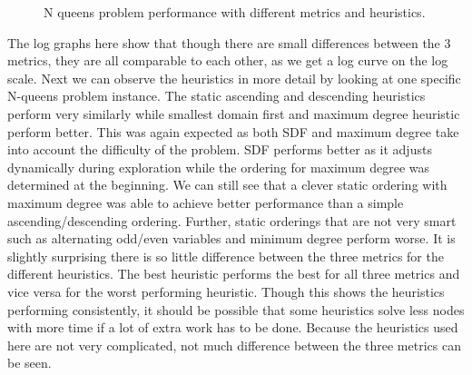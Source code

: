 \documentclass{article}
\begin{document}
\begin{figure}[H]
\centering
{}
\caption{N queens problem performance with different metrics and heuristics.}
\end{figure}
\noindent
The log graphs here show that though there are small differences between the 3 metrics, they are all comparable to each other, as we get a log curve on the log scale. 
\n
Next we can observe the heuristics in more detail by looking at one specific N-queens problem instance. The static ascending and descending heuristics perform very similarly while smallest domain first and maximum degree heuristic perform better. This was again expected as both SDF and maximum degree take into account the difficulty of the problem. SDF performs better as it adjusts dynamically during exploration while the ordering for maximum degree was determined at the beginning. We can still see that a clever static ordering with maximum degree was able to achieve better performance than a simple ascending/descending ordering. Further, static orderings that are not very smart such as alternating odd/even variables and minimum degree perform worse. It is slightly surprising there is so little difference between the three metrics for the different heuristics. The best heuristic performs the best for all three metrics and vice versa for the worst performing heuristic. Though this shows the heuristics performing consistently, it should be possible that some heuristics solve less nodes with more time if a lot of extra work has to be done. Because the heuristics used here are not very complicated, not much difference between the three metrics can be seen. 
\end{document}
